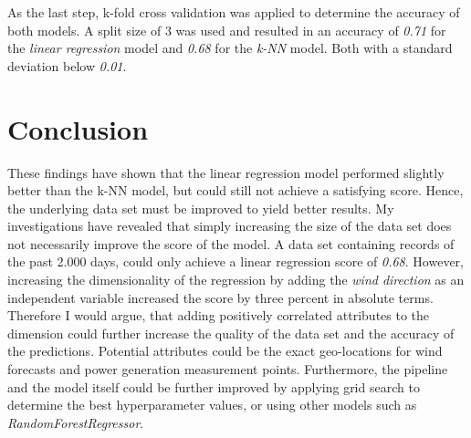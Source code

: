 \documentclass[12pt, a4paper]{article}
\begin{document}
As the last step, k-fold cross validation was applied to determine the accuracy of both models. A split size of 3 was used and resulted in an accuracy of \emph{0.71} for the \emph{linear regression} model and \emph{0.68} for the \emph{k-NN} model. Both with a standard deviation below \emph{0.01}.

\section{Conclusion}

These findings have shown that the linear regression model performed slightly better than the k-NN model, but could still not achieve a satisfying score.
Hence, the underlying data set must be improved to yield better results. My investigations have revealed that simply increasing the size of the data set does not necessarily improve the score of the model. A data set containing records of the past 2.000 days, could only achieve a linear regression score of \emph{0.68}. \newline However, increasing the dimensionality of the regression by adding the \emph{wind direction} as an independent variable increased the score by three percent in absolute terms. Therefore I would argue, that adding positively correlated attributes to the dimension could further increase the quality of the data set and the accuracy of the predictions. Potential attributes could be the exact geo-locations for wind forecasts and power generation measurement points.\newline
Furthermore, the pipeline and the model itself could be further improved by applying grid search to determine the best hyperparameter values, or using other models such as \emph{RandomForestRegressor}. 
\end{document}
